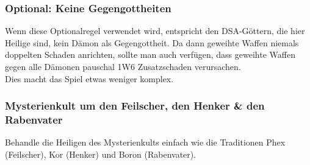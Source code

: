 \documentclass[9pt]{article}
\begin{document}
\begin{shaded*}
	\subsubsection{Optional: Keine Gegengottheiten}
	Wenn diese Optionalregel verwendet wird, entspricht den DSA-Göttern, die hier Heilige sind, kein Dämon als Gegengottheit. Da dann geweihte Waffen niemals doppelten Schaden anrichten, sollte man auch verfügen, dass geweihte Waffen gegen alle Dämonen pauschal 1W6 Zusatzschaden verursachen.\\
	Dies macht das Spiel etwas weniger komplex.
\end{shaded*}

\begin{shaded*}
	\subsubsection{Mysterienkult um den Feilscher, den Henker \& den Rabenvater}
	Behandle die Heiligen des Mysterienkults einfach wie die Traditionen Phex (Feilscher), Kor (Henker) und Boron (Rabenvater).
\end{shaded*}
\end{document}
